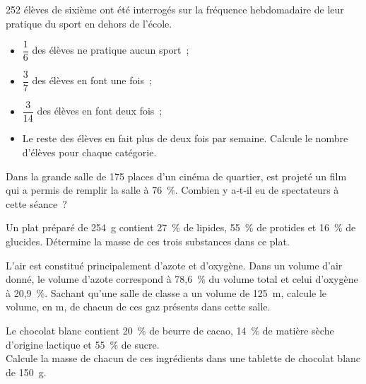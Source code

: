 \begin{exercice}
252 élèves de sixième ont été interrogés sur la fréquence hebdomadaire de leur pratique du sport en dehors de l'école. \\[0.2em]
\begin{itemize}
 \item $\dfrac{1}{6}$ des élèves ne pratique aucun sport ;
 \vspace{0.2cm}
 \item $\dfrac{3}{7}$ des élèves en font une fois ;
 \vspace{0.2cm}
 \item $\dfrac{3}{14}$ des élèves en font deux fois ;
 \vspace{0.2cm}
 \item Le reste des élèves en fait plus de deux fois par semaine. Calcule le nombre d'élèves pour chaque catégorie.
 \end{itemize}
\end{exercice}


\begin{exercice}[Au cinéma]
Dans la grande salle de 175 places d'un cinéma de quartier, est projeté un film qui a permis de remplir la salle à 76 \%. Combien y a‑t‑il eu de spectateurs à cette séance ?
\end{exercice}


\begin{exercice}
Un plat préparé de 254 g contient 27 \% de lipides, 55 \% de protides et 16 \% de glucides. 
Détermine la masse de ces trois substances dans ce plat.
\end{exercice}


\begin{exercice}[L'air]
L'air est constitué principalement d'azote et d'oxygène. Dans un volume d'air donné, le volume d'azote correspond à 78,6 \% du volume total et celui d'oxygène à 20,9 \%. Sachant qu'une salle de classe a un volume de 125 m, calcule le volume, en m, de chacun de ces gaz présents dans cette salle.
\end{exercice}


\begin{exercice}
Le chocolat blanc contient 20 \% de beurre de cacao, 14 \% de matière sèche d'origine lactique et 55 \% de sucre. \\[0.5em]
Calcule la masse de chacun de ces ingrédients dans une tablette de chocolat blanc de 150 g.
\end{exercice}


